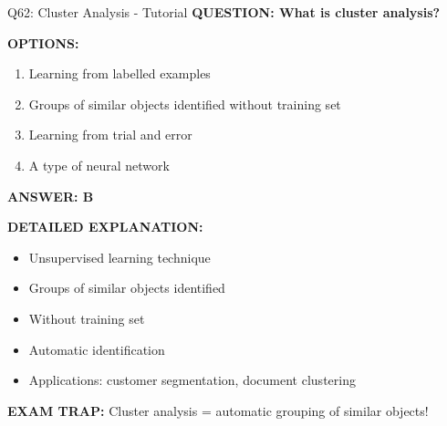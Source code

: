 \documentclass[8pt]{beamer}
\begin{document}
	\begin{frame}{Q62: Cluster Analysis - Tutorial}
		\fontsize{6.5}{7.5}\selectfont
		\textbf{QUESTION: What is cluster analysis?}
		
		\vspace{0.1cm}
		\textbf{OPTIONS:}
		\begin{enumerate}
			\item Learning from labelled examples
			\item Groups of similar objects identified without training set
			\item Learning from trial and error
			\item A type of neural network
		\end{enumerate}
		
		\vspace{0.1cm}
		\textcolor{myblue}{\textbf{ANSWER: B}}
		
		\vspace{0.1cm}
		\textbf{DETAILED EXPLANATION:}
		\begin{itemize}
			\item Unsupervised learning technique
			\item Groups of similar objects identified
			\item Without training set
			\item Automatic identification
			\item Applications: customer segmentation, document clustering
		\end{itemize}
		
		\vspace{0.1cm}
		\textcolor{myred}{\textbf{EXAM TRAP:}} Cluster analysis = \textcolor{myblue}{automatic grouping of similar objects}!
	\end{frame}
	
\end{document}
